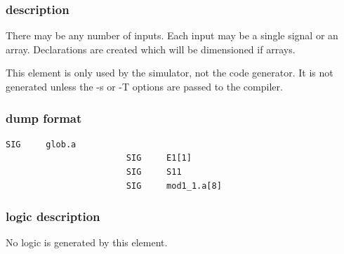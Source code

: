 \documentclass[10pt,a4paper,twoside,fleqn]{book}
\begin{document}
                \subsubsection{description}

                    There may be any number of inputs. Each input
                    may be a single signal or an array. Declarations
                    are created which will be dimensioned if arrays.

                    This element is only used by the simulator, not the code
                    generator. It is not generated unless the -s or -T options
                    are passed to the compiler.

                \subsubsection{dump format}

                    \begin{lstlisting}[gobble=20, language=tde]
                        SIG     glob.a
                        SIG     E1[1]
                        SIG     S11
                        SIG     mod1_1.a[8]
                    \end{lstlisting}

                \subsubsection{logic description}

                    No logic is generated by this element.
\end{document}
